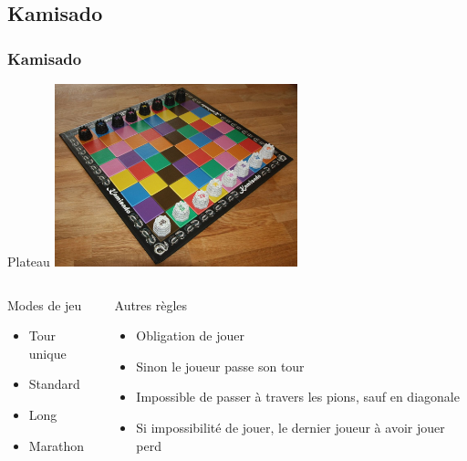 \documentclass[11pt]{beamer}
\begin{document}
\subsection[Kamisado]{Kamisado}
\begin{frame}
\frametitle{Kamisado}

\begin{center}
    \begin{block}{Plateau}
\centering \includegraphics[width=200pt]{images/kami.jpg}
    \end{block}
\end{center}


\end{frame}

\begin{frame}
\color{blue}

\begin{columns}[t]
    \begin{column}{3cm}
        \begin{block}{Modes de jeu}
            \begin{itemize}
                \item Tour unique
                \item Standard
                \item Long
                \item Marathon
            \end{itemize}
        \end{block}
    \end{column}
    
    \begin{column}{7cm}
        \begin{block}{ Autres règles}
            \begin{itemize}
                \item Obligation de jouer
                \item Sinon le joueur passe son tour
                \item Impossible de passer à travers les pions, sauf en diagonale
                
                \item Si impossibilité de jouer, le dernier joueur à avoir jouer perd
            \end{itemize}
        \end{block}
    \end{column}
\end{columns}

\end{frame}
\end{document}
